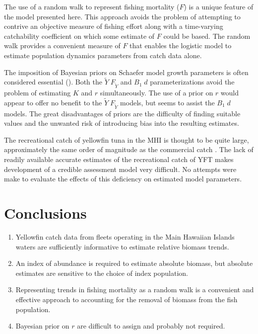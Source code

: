\documentclass[12pt,letterpaper,twoside]{article}
\newcommand\help[1]{\color{Magenta}{\it #1}\normalcolor}
\newcommand\MSY{\widetilde{Y}}
\newcommand\Fmsy{F_{\MSY}}
\newcommand\MSYFmsy{\MSY\;\Fmsy}
\newcommand\Bd{B_1\; d}
\begin{document}
The use of a random walk to represent fishing mortality ($F$) is a
unique feature of the model presented here.
This approach avoids the problem
of attempting to contrive an objective measure of fishing effort
along with a time-varying catchability coefficient
on which some estimate of $F$ could be based. The random walk provides
a convenient measure of $F$ that enables the logistic model
to estimate population dynamics parameters from catch data alone.

The imposition of Bayesian priors on Schaefer model growth parameters
is often considered essential (\help{references}). 
Both the $\MSYFmsy$ and $\Bd$
parameterizations avoid the problem of estimating $K$ and $r$
simultaneously. The use of a prior on $r$ would appear to offer no
benefit to the $\MSYFmsy$ models, but seems to assist the $\Bd$
models. The great disadvantages of priors are the difficulty of finding
suitable values and the unwanted risk of introducing bias
into the resulting estimates.

The recreational catch of yellowfin tuna in the MHI is thought to be
quite large, approximately the same order of magnitude as the
commercial catch \help{references}.
The lack of readily available accurate estimates of the recreational
catch of YFT makes development of a credible assessment model very
difficult. No attempts were make to evaluate the effects of this
deficiency on estimated model parameters.

\section{Conclusions}
\begin{enumerate}
\item Yellowfin catch data from fleets operating in the Main Hawaiian
Islands waters are sufficiently informative to estimate relative
biomass trends.
\item An index of abundance is required to estimate absolute biomass,
but absolute estimates are sensitive to the choice of index
population.
\item Representing trends in fishing mortality as a random walk is a
convenient and effective approach to accounting for the removal of
biomass from the fish population.
\item Bayesian prior on $r$ are difficult to assign and probably not required.
\end{enumerate}
\end{document}
